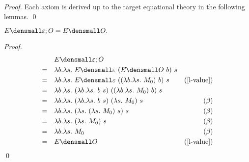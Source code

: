 \thmsoundness*
\begin{proof}
  Each axiom is derived up to the target equational theory in the following lemmas.
  \qed
\end{proof}

\begin{lemma}
  \label{thm:ext-compose-id-left}
    $ E\den{\varepsilon; O} = E\den{O}.$
\end{lemma}
    \begin{proof}
        \begin{align*}
            &\quad E\den{\varepsilon; O} \\
            =& \quad \lambda b. \lambda s.~ E\den{\varepsilon} ~(E\den{O} ~b) ~s \\
            =&  \quad \lambda b. \lambda s.~ E\den{\varepsilon} ~((\lambda b. \lambda s.~ M_0) ~b) ~s & (\cref{l-value})\\
            =& \quad \lambda b. \lambda s.~ (\lambda b. \lambda s.~ b ~s) ~((\lambda b. \lambda s.~ M_0) ~b) ~s \\
            =& \quad \lambda b. \lambda s.~ (\lambda b. \lambda s.~ b ~s) ~(\lambda s.~ M_0) ~s & (\beta)\\
            =& \quad \lambda b. \lambda s.~ (\lambda s.~ (\lambda s.~ M_0) ~s) ~s & (\beta)\\
            =& \quad \lambda b. \lambda s.~ (\lambda s.~ M_0) ~s & (\beta)\\
            =& \quad \lambda b. \lambda s.~ M_0 & (\beta) \\
            =& \quad E\den{O} & (\cref{l-value})
        \end{align*}
        \qed
    \end{proof}

    
